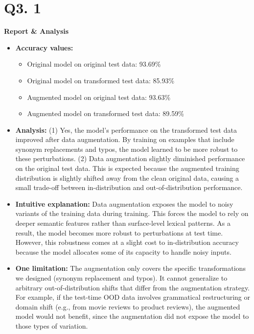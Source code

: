 \documentclass{article}
\begin{document}
\section*{Q3. 1}
\textbf{Report \& Analysis}
    \begin{itemize}
        \item \textbf{Accuracy values:}
        \begin{itemize}
            \item Original model on original test data: 93.69\%
            \item Original model on transformed test data: 85.93\%
            \item Augmented model on original test data: 93.63\%
            \item Augmented model on transformed test data: 89.59\%
        \end{itemize}

        \item \textbf{Analysis:}
        (1) Yes, the model's performance on the transformed test data improved after data augmentation. By training on examples that include synonym replacements and typos, the model learned to be more robust to these perturbations.
        (2) Data augmentation slightly diminished performance on the original test data. This is expected because the augmented training distribution is slightly shifted away from the clean original data, causing a small trade-off between in-distribution and out-of-distribution performance.

        \item \textbf{Intuitive explanation:}
        Data augmentation exposes the model to noisy variants of the training data during training. This forces the model to rely on deeper semantic features rather than surface-level lexical patterns. As a result, the model becomes more robust to perturbations at test time. However, this robustness comes at a slight cost to in-distribution accuracy because the model allocates some of its capacity to handle noisy inputs.

        \item \textbf{One limitation:}
        The augmentation only covers the specific transformations we designed (synonym replacement and typos). It cannot generalize to arbitrary out-of-distribution shifts that differ from the augmentation strategy. For example, if the test-time OOD data involves grammatical restructuring or domain shift (e.g., from movie reviews to product reviews), the augmented model would not benefit, since the augmentation did not expose the model to those types of variation.
    \end{itemize}
\end{document}
